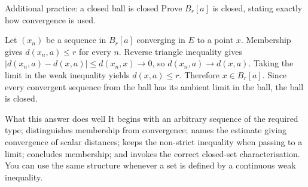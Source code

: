 \begin{exam}{Additional practice: a closed ball is closed}
Prove $B_r[a]$ is closed, stating exactly how convergence is used.
\end{exam}
\begin{answer}
Let $(x_n)$ be a sequence in $B_r[a]$ converging in $E$ to a point $x$. Membership gives $d(x_n,a)\le r$ for every $n$. Reverse triangle inequality gives $|d(x_n,a)-d(x,a)|\le d(x_n,x)\to0$, so $d(x_n,a)\to d(x,a)$. Taking the limit in the weak inequality yields $d(x,a)\le r$. Therefore $x\in B_r[a]$. Since every convergent sequence from the ball has its ambient limit in the ball, the ball is closed.
\end{answer}
\begin{note}{What this answer does well}
It begins with an arbitrary sequence of the required type; distinguishes membership from convergence; names the estimate giving convergence of scalar distances; keeps the non-strict inequality when passing to a limit; concludes membership; and invokes the correct closed-set characterisation. You can use the same structure whenever a set is defined by a continuous weak inequality.
\end{note}


